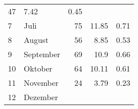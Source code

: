 \begin{longtable}{lXrrr}
       \num{47} &
       \num[round-mode=places,round-precision=2]{7,42} &
         \num[round-mode=places,round-precision=2]{0,45} \\

     7 &
     \multicolumn{1}{X}{ Juli   } &


       \num{75} &
       \num[round-mode=places,round-precision=2]{11,85} &
         \num[round-mode=places,round-precision=2]{0,71} \\

     8 &
     \multicolumn{1}{X}{ August   } &


       \num{56} &
       \num[round-mode=places,round-precision=2]{8,85} &
         \num[round-mode=places,round-precision=2]{0,53} \\

     9 &
     \multicolumn{1}{X}{ September   } &


       \num{69} &
       \num[round-mode=places,round-precision=2]{10,9} &
         \num[round-mode=places,round-precision=2]{0,66} \\

     10 &
     \multicolumn{1}{X}{ Oktober   } &


       \num{64} &
       \num[round-mode=places,round-precision=2]{10,11} &
         \num[round-mode=places,round-precision=2]{0,61} \\

     11 &
     \multicolumn{1}{X}{ November   } &


       \num{24} &
       \num[round-mode=places,round-precision=2]{3,79} &
         \num[round-mode=places,round-precision=2]{0,23} \\

     12 &
     \multicolumn{1}{X}{ Dezember   } &



\end{longtable}
